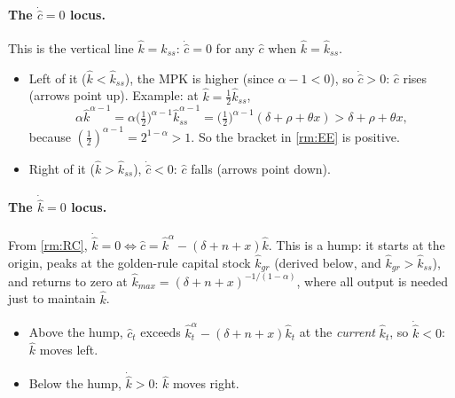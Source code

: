 \paragraph{The $\dot{\hat c}=0$ locus.} This is the vertical line $\hat k=\hat k_{ss}$: $\dot{\hat c}=0$ for any $\hat c$ when $\hat k=\hat k_{ss}$.
\begin{itemize}
\item Left of it ($\hat k<\hat k_{ss}$), the MPK is higher (since $\alpha-1<0$), so $\dot{\hat c}>0$: $\hat c$ rises (arrows point up). Example: at $\hat k=\tfrac12\hat k_{ss}$,
\[
\alpha\hat k^{\alpha-1}=\alpha\big(\tfrac12\big)^{\alpha-1}\hat k_{ss}^{\alpha-1}=\big(\tfrac12\big)^{\alpha-1}(\delta+\rho+\theta x)>\delta+\rho+\theta x,
\]
because $(\tfrac12)^{\alpha-1}=2^{1-\alpha}>1$. So the bracket in \eqref{rm:EE} is positive.
\item Right of it ($\hat k>\hat k_{ss}$), $\dot{\hat c}<0$: $\hat c$ falls (arrows point down).
\end{itemize}

\paragraph{The $\dot{\hat k}=0$ locus.} From \eqref{rm:RC}, $\dot{\hat k}=0\iff \hat c=\hat k^\alpha-(\delta+n+x)\hat k$. This is a hump: it starts at the origin, peaks at the golden-rule capital stock $\hat k_{gr}$ (derived below, and $\hat k_{gr}>\hat k_{ss}$), and returns to zero at $\hat k_{max}=(\delta+n+x)^{-1/(1-\alpha)}$, where all output is needed just to maintain $\hat k$.
\begin{itemize}
\item Above the hump, $\hat c_t$ exceeds $\hat k_t^\alpha-(\delta+n+x)\hat k_t$ at the \emph{current} $\hat k_t$, so $\dot{\hat k}<0$: $\hat k$ moves left.
\item Below the hump, $\dot{\hat k}>0$: $\hat k$ moves right.
\end{itemize}

